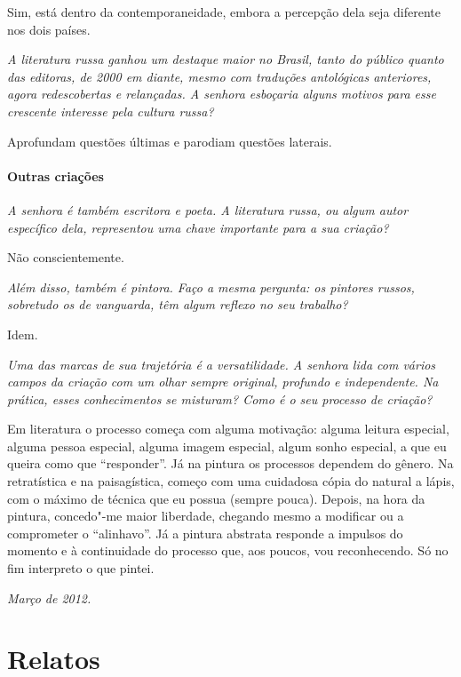 Sim, está dentro da contemporaneidade, embora a percepção dela seja
diferente nos dois países.

\medskip

\emph{A literatura russa ganhou um destaque maior no Brasil, tanto do
público quanto das editoras, de 2000 em diante, mesmo com traduções
antológicas anteriores, agora redescobertas e relançadas. A senhora
esboçaria alguns motivos para esse crescente interesse pela cultura
russa?}

Aprofundam questões últimas e parodiam questões laterais.

\subsection{\uppercase{O}utras criações}

\emph{A senhora é também escritora e poeta. A literatura russa, ou algum
autor específico dela, representou uma chave importante para a sua
criação?}

Não conscientemente.

\medskip

\emph{Além disso, também é pintora. Faço a mesma pergunta: os pintores
russos, sobretudo os de vanguarda, têm algum reflexo no seu trabalho?}

Idem.

\medskip

\emph{Uma das marcas de sua trajetória é a versatilidade. A senhora lida
com vários campos da criação com um olhar sempre original, profundo e
independente. Na prática, esses conhecimentos se misturam? Como é o seu
processo de criação?}

Em literatura o processo começa com alguma motivação: alguma leitura
especial, alguma pessoa especial, alguma imagem especial, algum sonho
especial, a que eu queira como que ``responder''. Já na pintura os
processos dependem do gênero. Na retratística e na paisagística, começo
com uma cuidadosa cópia do natural a lápis, com o máximo de técnica que
eu possua (sempre pouca). Depois, na hora da pintura, concedo"-me maior
liberdade, chegando mesmo a modificar ou a comprometer o ``alinhavo''.
Já a pintura abstrata responde a impulsos do momento e à continuidade do
processo que, aos poucos, vou reconhecendo. Só no fim interpreto o que
pintei.

\begin{flushright}
\emph{Março de 2012.}
\end{flushright}

\part{Relatos}

